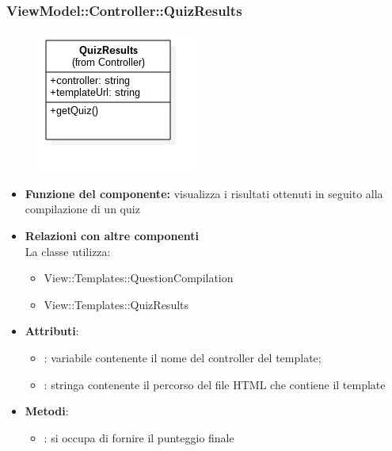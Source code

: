  \subsubsection{ViewModel::Controller::QuizResults}
 \begin{figure}[h!]
\begin{center}
	\includegraphics[scale=0.6]{../images/ViewModel/Controller/QuizResults.png}
\end{center}
\end{figure}
 \begin{itemize}
 \item\textbf{Funzione del componente:} visualizza i risultati ottenuti in seguito alla compilazione di un quiz
 \item\textbf{Relazioni con altre componenti}\\
 La classe utilizza:
 	\begin{itemize}
 		\item View::Templates::QuestionCompilation
 		\item View::Templates::QuizResults
 	\end{itemize}
 \item\textbf{Attributi}:
 	\begin{itemize}
 		\item{}: variabile contenente il nome del controller del template;\\
		\item{}: stringa contenente il percorso del file HTML che contiene il template\\
 	\end{itemize}
 	\item\textbf{Metodi}:
 	\begin{itemize}
 		\item{}: si occupa di fornire il punteggio finale
 	\end{itemize}
 \end{itemize}
\newpage
 
